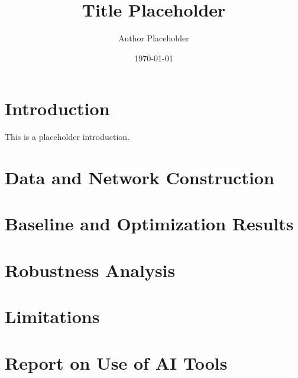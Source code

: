 \documentclass{article}
\title{Title Placeholder}
\author{Author Placeholder}
\date{\today}
\begin{document}
\maketitle

\section{Introduction}
This is a placeholder introduction.

\section{Data and Network Construction}


\section{Baseline and Optimization Results}


\section{Robustness Analysis}


\section{Limitations}


\appendix
\section{Report on Use of AI Tools}




\end{document}
